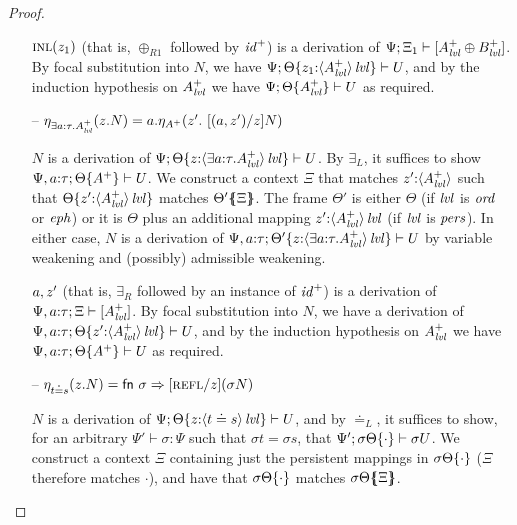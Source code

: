 \begin{proof}
\begin{itemize}
$\tinl{z_1}$ (that is, $\oplus_{R1}$ followed by ${\it id}^+$) is a
derivation of $\foc{\Psi}{\Xi_1}{[A^+_\mlvl \oplus B^+_\mlvl]}$.  By
focal substitution into $N$, we have 
$\foc{\Psi}{\tackon{\Theta}{z_1{:}\islvl{\susp{A^+_\mlvl}}}}{U}$, and by the
induction hypothesis on $A^+_\mlvl$ we have 
$\foc{\Psi}{\tackon{\Theta}{A^+_\mlvl}}{U}$ as required.
\smallskip

\item[--] $\etapa{z}{N}{\exists a{:}\tau. A^+_\mlvl} 
           = \texistsl{a}
              {\etapa{z'}
                {~[(\texistsr{a}{z'})/z]N}
                {A^+}}$ 
\smallskip

$N$ is a derivation of 
$\foc{\Psi}{\tackon{\Theta}{z{:}\islvl{\susp{\exists a{:}\tau. A^+_\mlvl}}}}
  {U}$.
By $\exists_L$, it suffices to show 
$\foc{\Psi, a{:}\tau}{\tackon{\Theta}{A^+}}{U}$.
We construct a context $\Xi$ that matches
$z'{:}\susp{A^+_\mlvl}$ such that
$\tackon{\Theta}{z'{:}\islvl{\susp{A^+_\mlvl}}}$ matches
$\frameoff{\Theta'}{\Xi}$. The frame $\Theta'$ is either $\Theta$
(if $\mlvl$ is $\mtrue$ or $\meph$) or it is $\Theta$ plus 
an additional mapping $z'{:}\islvl{\susp{A^+_\mlvl}}$
(if $\mlvl$ is $\mpers$). In either case,
$N$ is a derivation of 
$\foc{\Psi, a{:}\tau}
  {\tackon{\Theta'}{z{:}\islvl{\susp{\exists a{:}\tau. A^+_\mlvl}}}}
  {U}$ by variable weakening and (possibly) admissible weakening.

\smallskip
$\texistsr{a}{z'}$ (that is, $\exists_R$ followed by 
an instance of ${\it id}^+$) is a derivation of 
$\foc{\Psi, a{:}\tau}{\Xi}{[A^+_\mlvl]}$. By focal 
substitution into $N$, we have a derivation of 
$\foc{\Psi, a{:}\tau}{\tackon{\Theta}{z'{:}\islvl{\susp{A^+_\mlvl}}}}{U}$,
and by the induction hypothesis on $A^+_\mlvl$ we have
$\foc{\Psi, a{:}\tau}{\tackon{\Theta}{A^+}}{U}$ as required.

\smallskip

\item[--] $\etapa{z}{N}{t \doteq s} 
           = {\sf fn}~ \sigma \Rightarrow [\tunifr/z](\sigma{N})$
\smallskip

$N$ is a derivation of $\foc{\Psi}{\tackon{\Theta}{z{:}\islvl{\susp{t
        \doteq s}}}}{U}$, and by $\doteq_L$, it suffices to show, for
an arbitrary $\Psi' \vdash \sigma : \Psi$ such that $\sigma{t} =
\sigma{s}$, that
$\foc{\Psi'}{\tackon{\sigma\Theta}{\cdot}}{\sigma{U}}$.  We construct
a context $\Xi$ containing just the persistent mappings in
$\tackon{\sigma\Theta}{\cdot}$ ($\Xi$ therefore matches $\cdot$), and
have that $\tackon{\sigma\Theta}{\cdot}$ matches
$\frameoff{\sigma\Theta}{\Xi}$.


\end{itemize}
\end{proof}
